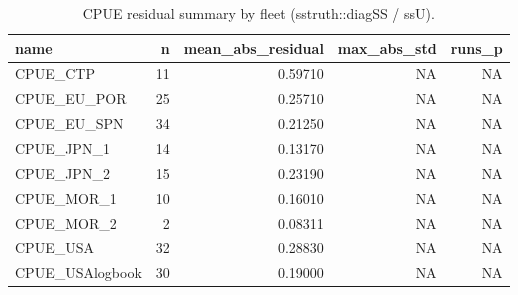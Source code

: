 \begin{table}

\caption{\label{tab:internal-ssu-summary}CPUE residual summary by fleet (sstruth::diagSS / ssU).}
\centering
\begin{tabular}[t]{lrrrr}
\toprule
name & n & mean\_abs\_residual & max\_abs\_std & runs\_p\\
\midrule
CPUE\_CTP & 11 & 0.59710 & NA & NA\\
CPUE\_EU\_POR & 25 & 0.25710 & NA & NA\\
CPUE\_EU\_SPN & 34 & 0.21250 & NA & NA\\
CPUE\_JPN\_1 & 14 & 0.13170 & NA & NA\\
CPUE\_JPN\_2 & 15 & 0.23190 & NA & NA\\
\addlinespace
CPUE\_MOR\_1 & 10 & 0.16010 & NA & NA\\
CPUE\_MOR\_2 & 2 & 0.08311 & NA & NA\\
CPUE\_USA & 32 & 0.28830 & NA & NA\\
CPUE\_USAlogbook & 30 & 0.19000 & NA & NA\\
\bottomrule
\end{tabular}
\end{table}


